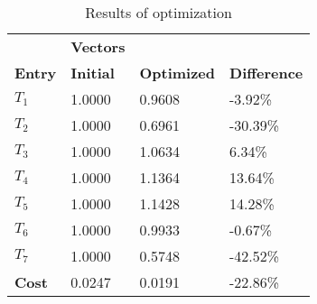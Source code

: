 \begin{table}[H]
\centering
\begin{tabular}{llll}
\textbf{}      & \cellcolor[HTML]{EFEFEF}\textbf{Vectors} & \textbf{} & \textbf{}         \\
\rowcolor[HTML]{EFEFEF} 
\textbf{Entry} & \textbf{Initial} & \textbf{Optimized} & \textbf{Difference} \\
$T_1$ & 1.0000 & 0.9608 & -3.92\% \\ 
$T_2$ & 1.0000 & 0.6961 & -30.39\% \\ 
$T_3$ & 1.0000 & 1.0634 & 6.34\% \\ 
$T_4$ & 1.0000 & 1.1364 & 13.64\% \\ 
$T_5$ & 1.0000 & 1.1428 & 14.28\% \\ 
$T_6$ & 1.0000 & 0.9933 & -0.67\% \\ 
$T_7$ & 1.0000 & 0.5748 & -42.52\% \\ 
\rowcolor[HTML]{EFEFEF} 
\textbf{Cost}  & 0.0247 & 0.0191 & -22.86\% \\ 
\end{tabular}
\caption{Results of optimization}
\label{tab:OptimizationAnalysis}
\end{table}
